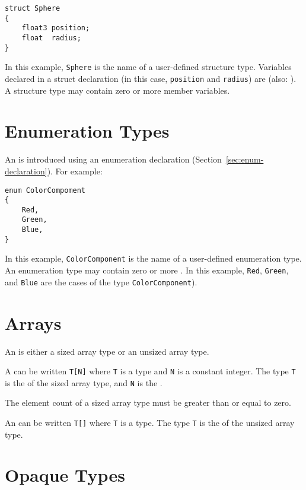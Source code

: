 \begin{lstlisting}
struct Sphere
{
    float3 position;
    float  radius;
}
\end{lstlisting}

In this example, \lstinline|Sphere| is the name of a user-defined structure type.
Variables declared in a struct declaration (in this case, \lstinline|position| and \lstinline|radius|) are  (also: ).
A structure type may contain zero or more member variables.

\section{Enumeration Types}

An  is introduced using an enumeration declaration (Section~\ref{sec:enum-declaration}).
For example:

\begin{lstlisting}
enum ColorCompoment
{
    Red,
    Green,
    Blue,
}
\end{lstlisting}

In this example, \lstinline|ColorComponent| is the name of a user-defined enumeration type.
An enumeration type may contain zero or more .
In this example, \lstinline|Red|, \lstinline|Green|, and \lstinline|Blue| are the cases of the type \lstinline|ColorComponent|).

\section{Arrays}

An  is either a sized array type or an unsized array type.

A  can be written \lstinline|T[N]| where \lstinline|T| is a type and \lstinline|N| is a constant integer.
The type \lstinline|T| is the  of the sized array type, and \lstinline|N| is the .

The element count of a sized array type must be greater than or equal to zero.

An  can be written \lstinline|T[]| where \lstinline|T| is a type.
The type \lstinline|T| is the  of the unsized array type.

\section{Opaque Types}

